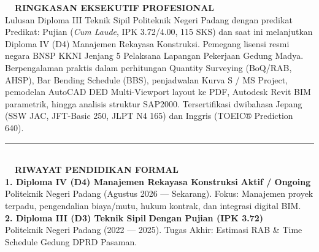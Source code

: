 \documentclass[10pt,a4paper,landscape]{article}
\begin{document}
\noindent
\begin{minipage}[t]{0.58\linewidth}
  \vspace{0pt}
  \begin{tcolorbox}[sharp corners, boxrule=0.8pt, colframe=pborder, colback=white, left=3.5mm, right=3.5mm, top=2.5mm, bottom=2.5mm, height=100mm]
    \colorbox{pred}{\fontsize{7pt}{8pt}\selectfont\bfseries\color{white}\ \ RINGKASAN EKSEKUTIF PROFESIONAL\ \ }\\[1.5mm]
    {\fontsize{7.2pt}{9.6pt}\selectfont\color{psteel}Lulusan Diploma III Teknik Sipil Politeknik Negeri Padang dengan predikat Predikat: Pujian (\textit{Cum Laude}, IPK 3.72/4.00, 115 SKS) dan saat ini melanjutkan Diploma IV (D4) Manajemen Rekayasa Konstruksi. Pemegang lisensi resmi negara BNSP KKNI Jenjang 5 Pelaksana Lapangan Pekerjaan Gedung Madya.}\\[1.5mm]
    {\fontsize{7.2pt}{9.6pt}\selectfont\color{psteel}Berpengalaman praktis dalam perhitungan Quantity Surveying (BoQ/RAB, AHSP), Bar Bending Schedule (BBS), penjadwalan Kurva S / MS Project, pemodelan AutoCAD DED Multi-Viewport layout ke PDF, Autodesk Revit BIM parametrik, hingga analisis struktur SAP2000. Tersertifikasi dwibahasa Jepang (SSW JAC, JFT-Basic 250, JLPT N4 165) dan Inggris (TOEIC® Prediction 640).}\\[2mm]

    \noindent\textcolor{pborder}{\rule{\linewidth}{0.5pt}}\\[1.5mm]

    \colorbox{pnavy}{\fontsize{7pt}{8pt}\selectfont\bfseries\color{white}\ \ RIWAYAT PENDIDIKAN FORMAL\ \ }\\[1.5mm]

    {\fontsize{7.8pt}{9.2pt}\selectfont\bfseries\color{pnavy}1. Diploma IV (D4) Manajemen Rekayasa Konstruksi} \hfill {\fontsize{6.8pt}{8pt}\selectfont\color{pred}\textbf{Aktif / Ongoing}}\\[0.3mm]
    {\fontsize{6.8pt}{8pt}\selectfont\color{psteel}Politeknik Negeri Padang (Agustus 2026 --- Sekarang). Fokus: Manajemen proyek terpadu, pengendalian biaya/mutu, hukum kontrak, dan integrasi digital BIM.}\\[1.2mm]

    {\fontsize{7.8pt}{9.2pt}\selectfont\bfseries\color{pnavy}2. Diploma III (D3) Teknik Sipil} \hfill {\fontsize{6.8pt}{8pt}\selectfont\color{pred}\textbf{Dengan Pujian (IPK 3.72)}}\\[0.3mm]
    {\fontsize{6.8pt}{8pt}\selectfont\color{psteel}Politeknik Negeri Padang (2022 --- 2025). Tugas Akhir: Estimasi RAB \& Time Schedule Gedung DPRD Pasaman.}\\[1.2mm]


\end{tcolorbox}
\end{minipage}
\end{document}
